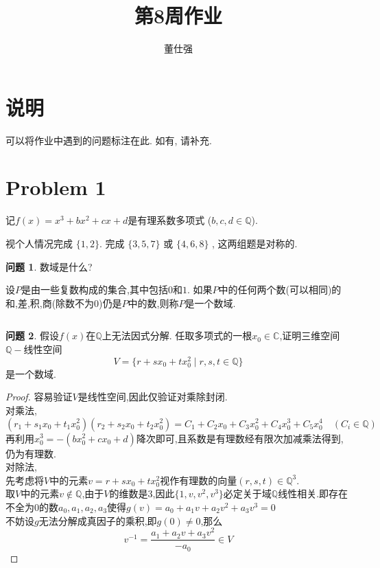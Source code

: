 \documentclass[11pt]{ctexart}
\title{第8周作业}
\author{董仕强}
\theoremstyle{definition}
\newtheorem{qqq}{问题}[section]
\numberwithin{equation}{section}
\begin{document}
\maketitle

\section{说明}

可以将作业中遇到的问题标注在此. 如有, 请补充.\\


\tableofcontents

\newpage


\section{Problem 1}

记$f(x)=x^3+bx^2+cx+d$是有理系数多项式 ($b,c,d \in \mathbb{Q}$).\\
\begin{qing}
    视个人情况完成  $\{1,2\}$. 完成  $\{3,5,7\}$ 或 $\{4,6,8\}$ , 这两组题是对称的.
\end{qing}

\begin{qqq}数域是什么?\end{qqq}
\begin{aaa}
    设$P$是由一些复数构成的集合,其中包括$0$和$1$. 如果$P$中的任何两个数(可以相同)的和,差,积,商(除数不为0)仍是$P$中的数,则称$P$是一个数域.
\end{aaa}
\[{}\]
\begin{qqq}
    假设$f(x)$在$\mathbb{Q}$上无法因式分解. 任取多项式的一根$x_0\in \mathbb{C}$,证明三维空间$\mathbb{Q}-$线性空间
    \begin{equation}
        V=\{r+sx_0+tx_0^2\mid r,s,t \in \mathbb{Q}\}
    \end{equation}
    是一个数域.
\end{qqq}
\begin{proof}
    容易验证$V$是线性空间,因此仅验证对乘除封闭.\\
    对乘法,\[
        (r_1+s_1x_0+t_1x_0^2)(r_2+s_2x_0+t_2x_0^2)
        =C_1+C_2x_0+C_3x_0^2+C_4x_0^3+C_5x_0^4 \quad (C_i \in \mathbb{Q})
    \]
    再利用$x_0^3=-(bx_0^2+cx_0+d)$降次即可,且系数是有理数经有限次加减乘法得到,仍为有理数.\\
    对除法,\\先考虑将$V$中的元素$v=r+sx_0+tx_0^2$视作有理数的向量$(r,s,t)\in\mathbb{Q}^3$.\\
    取$V$中的元素$v \notin\mathbb{Q}$,由于$V$的维数是3,因此$\{1,v,v^2,v^3\}$必定关于域$\mathbb{Q}$线性相关.即存在不全为0的数$a_0,a_1,a_2,a_3$使得$g(v)=a_0+a_1v+a_2v^2+a_3v^3=0$\\
    不妨设$g$无法分解成真因子的乘积,即$g(0)\neq 0$,那么\[v^{-1}=\frac{a_1+a_2v+a_3v^2}{-a_0}\in V\]
\end{proof}
\end{document}

